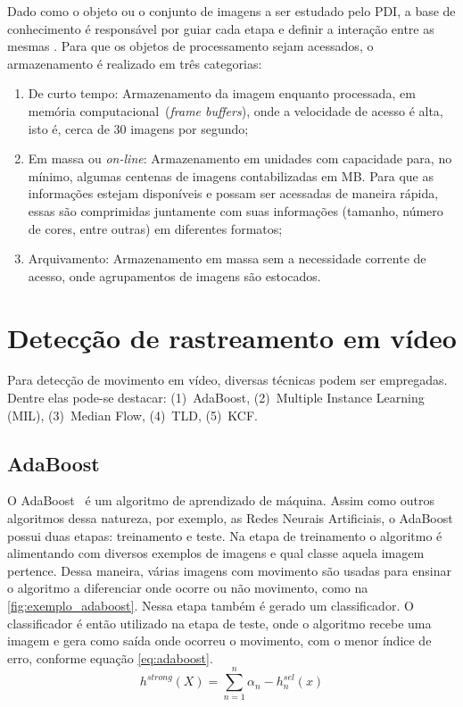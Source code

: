 \documentclass[12pt,oneside,a4paper,chapter=TITLE,section=TITLE,sumario=tradicional]{abntex2}
\begin{document}
Dado como o objeto ou o conjunto de imagens a ser estudado pelo PDI, a base de conhecimento é responsável por guiar cada etapa e definir a interação entre as mesmas \cite[p.6]{pdi2006}. Para que os objetos de processamento sejam acessados, o armazenamento é realizado em três categorias:

    \begin{enumerate}
        \item De curto tempo: Armazenamento da imagem enquanto processada, em memória computacional~(\textit{frame buffers}), onde a velocidade de acesso é alta, isto é, cerca de 30 imagens por segundo;
        \item Em massa ou \textit{on-line}: Armazenamento em unidades com capacidade para, no mínimo, algumas centenas de imagens contabilizadas em MB. Para que as informações estejam disponíveis e possam ser acessadas de maneira rápida, essas são comprimidas juntamente com suas informações (tamanho, número de cores, entre outras) em diferentes formatos;
        \item Arquivamento: Armazenamento em massa sem a necessidade corrente de acesso, onde agrupamentos de imagens são estocados.
    \end{enumerate}

\section{Detecção de rastreamento em vídeo}

Para detecção de movimento em vídeo, diversas técnicas podem ser empregadas. Dentre elas pode-se destacar: (1)~AdaBoost, (2)~Multiple Instance Learning (MIL), (3)~Median Flow, (4)~TLD, (5)~KCF.

\subsection{AdaBoost}

O AdaBoost~\cite{grabner2006line} é um algoritmo de aprendizado de máquina. Assim como outros algoritmos dessa natureza, por exemplo, as Redes Neurais Artificiais, o AdaBoost possui duas etapas: treinamento e teste. Na etapa de treinamento o algoritmo é alimentando com diversos exemplos de imagens e qual classe aquela imagem pertence. Dessa maneira, várias imagens com movimento são usadas para ensinar o algoritmo a diferenciar onde ocorre ou não movimento, como na \autoref{fig:exemplo_adaboost}. Nessa etapa também é gerado um classificador. O classificador é então utilizado na etapa de teste, onde o algoritmo recebe uma imagem e gera como saída onde ocorreu o movimento, com o menor índice de erro, conforme equação \ref{eq:adaboost}.
\begin{equation}
\label{eq:adaboost}
h^{strong}(X) = \sum^n_{n=1}\alpha _n-h^{sel}_n (x)
\end{equation}
\end{document}
